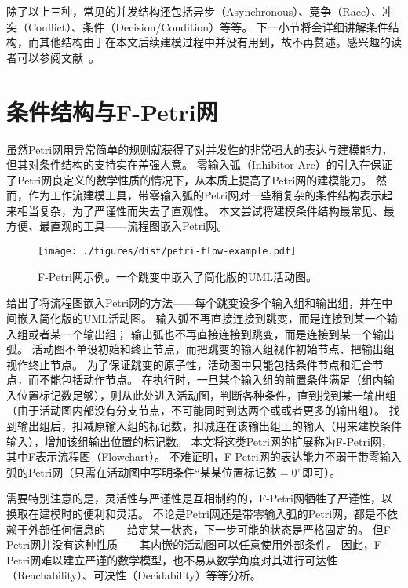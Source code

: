 \documentclass[index]{subfiles}
\begin{document}
除了以上三种，常见的并发结构还包括异步（Asynchronous）、竞争（Race）、冲突（Conflict）、条件（Decision/Condition）等等。
下一小节将会详细讲解条件结构，而其他结构由于在本文后续建模过程中并没有用到，故不再赘述。感兴趣的读者可以参阅文献~。

\section{条件结构与F-Petri网}
虽然Petri网用异常简单的规则就获得了对并发性的非常强大的表达与建模能力，但其对条件结构的支持实在差强人意\cite{peterson1981}。
零输入弧（Inhibitor Arc）的引入\cite{keller1972}在保证了Petri网良定义的数学性质的情况下，从本质上提高了Petri网的建模能力。
然而，作为工作流建模工具，带零输入弧的Petri网对一些稍复杂的条件结构表示起来相当复杂，为了严谨性而失去了直观性。
本文尝试将建模条件结构最常见、最方便、最直观的工具——流程图\cite{gilbreth1921}嵌入Petri网。

\begin{figure}[h]
  \centering
  \texttt{[image: ./figures/dist/petri-flow-example.pdf]}
  \caption[F-Petri网示例]{F-Petri网示例。一个跳变中嵌入了简化版的UML活动图。\label{fig:petri-flow}}
\end{figure}

给出了将流程图嵌入Petri网的方法——每个跳变设多个输入组和输出组，并在中间嵌入简化版的UML活动图。
输入弧不再直接连接到跳变，而是连接到某一个输入组或者某一个输出组；
输出弧也不再直接连接到跳变，而是连接到某一个输出弧。
活动图不单设初始和终止节点，而把跳变的输入组视作初始节点、把输出组视作终止节点。
为了保证跳变的原子性，活动图中只能包括条件节点和汇合节点，而不能包括动作节点。
在执行时，一旦某个输入组的前置条件满足（组内输入位置标记数足够），则从此处进入活动图，判断各种条件，直到找到某一输出组
（由于活动图内部没有分支节点，不可能同时到达两个或或者更多的输出组）。
找到输出组后，扣减原输入组的标记数，扣减连在该输出组上的输入（用来建模条件输入），增加该组输出位置的标记数。
本文将这类Petri网的扩展称为F-Petri网，其中F表示流程图（Flowchart）。
不难证明，F-Petri网的表达能力不弱于带零输入弧的Petri网（只需在活动图中写明条件“某某位置标记数$=0$”即可）。

需要特别注意的是，灵活性与严谨性是互相制约的，F-Petri网牺牲了严谨性，以换取在建模时的便利和灵活。
不论是Petri网还是带零输入弧的Petri网，都是不依赖于外部任何信息的——给定某一状态，下一步可能的状态是严格固定的。
但F-Petri网并没有这种性质——其内嵌的活动图可以任意使用外部条件。
因此，F-Petri网难以建立严谨的数学模型，也不易从数学角度对其进行可达性（Reachability）、可决性（Decidability）等等分析。
\end{document}
